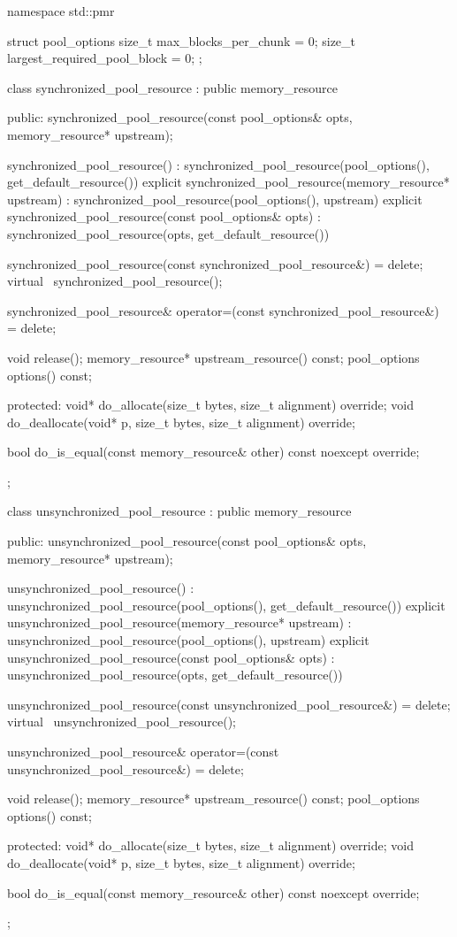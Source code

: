 %
%
%
\begin{codeblock}
namespace std::pmr {
  struct pool_options {
    size_t max_blocks_per_chunk = 0;
    size_t largest_required_pool_block = 0;
  };

  class synchronized_pool_resource : public memory_resource {
  public:
    synchronized_pool_resource(const pool_options& opts, memory_resource* upstream);

    synchronized_pool_resource()
        : synchronized_pool_resource(pool_options(), get_default_resource()) {}
    explicit synchronized_pool_resource(memory_resource* upstream)
        : synchronized_pool_resource(pool_options(), upstream) {}
    explicit synchronized_pool_resource(const pool_options& opts)
        : synchronized_pool_resource(opts, get_default_resource()) {}

    synchronized_pool_resource(const synchronized_pool_resource&) = delete;
    virtual ~synchronized_pool_resource();

    synchronized_pool_resource& operator=(const synchronized_pool_resource&) = delete;

    void release();
    memory_resource* upstream_resource() const;
    pool_options options() const;

  protected:
    void* do_allocate(size_t bytes, size_t alignment) override;
    void do_deallocate(void* p, size_t bytes, size_t alignment) override;

    bool do_is_equal(const memory_resource& other) const noexcept override;
  };

  class unsynchronized_pool_resource : public memory_resource {
  public:
    unsynchronized_pool_resource(const pool_options& opts, memory_resource* upstream);

    unsynchronized_pool_resource()
        : unsynchronized_pool_resource(pool_options(), get_default_resource()) {}
    explicit unsynchronized_pool_resource(memory_resource* upstream)
        : unsynchronized_pool_resource(pool_options(), upstream) {}
    explicit unsynchronized_pool_resource(const pool_options& opts)
        : unsynchronized_pool_resource(opts, get_default_resource()) {}

    unsynchronized_pool_resource(const unsynchronized_pool_resource&) = delete;
    virtual ~unsynchronized_pool_resource();

    unsynchronized_pool_resource& operator=(const unsynchronized_pool_resource&) = delete;

    void release();
    memory_resource* upstream_resource() const;
    pool_options options() const;

  protected:
    void* do_allocate(size_t bytes, size_t alignment) override;
    void do_deallocate(void* p, size_t bytes, size_t alignment) override;

    bool do_is_equal(const memory_resource& other) const noexcept override;
  };
}
\end{codeblock}

